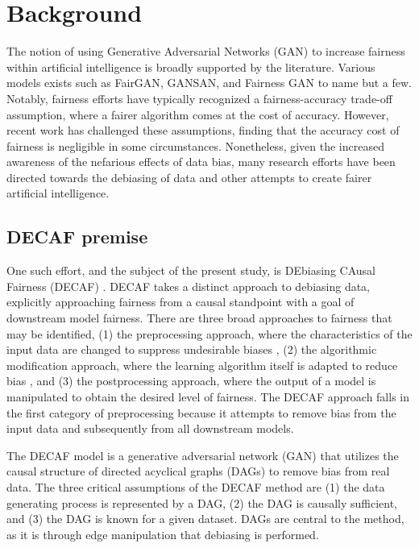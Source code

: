 \section{Background}
The notion of using Generative Adversarial Networks (GAN) to increase fairness within artificial intelligence is broadly supported by the literature. Various models exists such as FairGAN\citep{xu_yuan_zhang_wu_2018}, GANSAN\citep{DBLP:journals/algorithms/AivodjiBGNT21}, and Fairness GAN \citep{sattigeri_hoffman_chenthamarakshan_varshney_2019} to name but a few. Notably, fairness efforts have typically recognized a fairness-accuracy trade-off assumption, where a fairer algorithm comes at the cost of accuracy. However, recent work has challenged these assumptions, finding that the accuracy cost of fairness is negligible in some circumstances\citep{rodolfa_lamba_ghani_2021}. Nonetheless, given the increased awareness of the nefarious effects of data bias, many research efforts have been directed towards the debiasing of data and other attempts to create fairer artificial intelligence\citep{DBLP:journals/csur/MehrabiMSLG21}.

\subsection{DECAF premise}
One such effort, and the subject of the present study, is DEbiasing CAusal Fairness (DECAF) \citep{DBLP:conf/nips/BreugelKBS21}. DECAF takes a distinct approach to debiasing data, explicitly approaching fairness from a causal standpoint with a goal of downstream model fairness. There are three broad approaches to fairness that may be identified, (1) the preprocessing approach, where the characteristics of the input data are changed to suppress undesirable biases \citep{DBLP:conf/nips/BreugelKBS21}, (2) the algorithmic modification approach, where the learning algorithm itself is adapted to reduce bias \citep{article}, and (3) the postprocessing approach, where the output of a model is manipulated to obtain the desired level of fairness\citep{kamishima_akaho_asoh_sakuma_2012}. The DECAF approach falls in the first category of preprocessing because it attempts to remove bias from the input data and subsequently from all downstream models.

The DECAF model is a generative adversarial network (GAN) that utilizes the causal structure of directed acyclical graphs (DAGs) to remove bias from real data. The three critical assumptions of the DECAF method are (1) the data generating process is represented by a DAG, (2) the DAG is causally sufficient, and (3) the DAG is known for a given dataset. DAGs are central to the method, as it is through edge manipulation that debiasing is performed.

